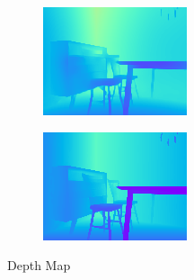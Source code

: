 \begin{figure}[t]
  \centering
  \begin{subfigure}{0.45\linewidth}
    \centering
    \includegraphics[width=\linewidth]{figs/depth_ours.png}
    \label{subfig:sub1}
  \end{subfigure}
  \hspace{0.05\linewidth} %
  \begin{subfigure}{0.45\linewidth}
    \centering
    \includegraphics[width=\linewidth]{figs/depth_pan.png}
    \label{subfig:sub2}
  \end{subfigure}
  \vspace*{-3mm} %
  \caption*{Depth Map}


\end{figure}
